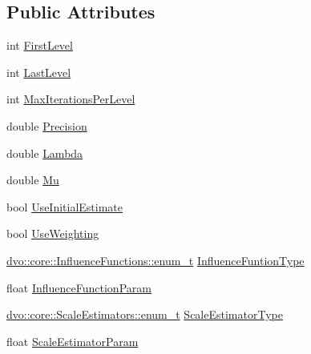 \subsection*{Public Attributes}
\begin{DoxyCompactItemize}
\item 
int \mbox{\hyperlink{structdvo_1_1_dense_tracker_1_1_config_af07fb088139f396d4bb19098ef263131}{First\+Level}}
\item 
int \mbox{\hyperlink{structdvo_1_1_dense_tracker_1_1_config_ae96df17e33f1193c3ab6fbf5efc930dd}{Last\+Level}}
\item 
int \mbox{\hyperlink{structdvo_1_1_dense_tracker_1_1_config_a80800ec37764ee5104923d43aad84ce4}{Max\+Iterations\+Per\+Level}}
\item 
double \mbox{\hyperlink{structdvo_1_1_dense_tracker_1_1_config_abc739e291273bf79606cfe4963ee5ab4}{Precision}}
\item 
double \mbox{\hyperlink{structdvo_1_1_dense_tracker_1_1_config_ae54b4a38091ee23d984afa4394131082}{Lambda}}
\item 
double \mbox{\hyperlink{structdvo_1_1_dense_tracker_1_1_config_ad730897eef6700450f9a96f1712fde41}{Mu}}
\item 
bool \mbox{\hyperlink{structdvo_1_1_dense_tracker_1_1_config_a2fa85ee168aa0bbd24aee72f97943a85}{Use\+Initial\+Estimate}}
\item 
bool \mbox{\hyperlink{structdvo_1_1_dense_tracker_1_1_config_a42ef85cd4907ab5c65b37a17ad1315d4}{Use\+Weighting}}
\item 
\mbox{\hyperlink{structdvo_1_1core_1_1_influence_functions_a3fcb0831eb60e196888641a64fff665f}{dvo\+::core\+::\+Influence\+Functions\+::enum\+\_\+t}} \mbox{\hyperlink{structdvo_1_1_dense_tracker_1_1_config_a464bdce67b2fb96a49808bae1c9c775a}{Influence\+Funtion\+Type}}
\item 
float \mbox{\hyperlink{structdvo_1_1_dense_tracker_1_1_config_a87ea8193f2e731a76cba63e56a853009}{Influence\+Function\+Param}}
\item 
\mbox{\hyperlink{structdvo_1_1core_1_1_scale_estimators_a5bd47dbbdca475d830703b07b0864f5e}{dvo\+::core\+::\+Scale\+Estimators\+::enum\+\_\+t}} \mbox{\hyperlink{structdvo_1_1_dense_tracker_1_1_config_a9b902aa9f9ffbca70b38edb9416ddbf8}{Scale\+Estimator\+Type}}
\item 
float \mbox{\hyperlink{structdvo_1_1_dense_tracker_1_1_config_a5477e9a5a7e8da5e066db1446211bf51}{Scale\+Estimator\+Param}}
\end{DoxyCompactItemize}


